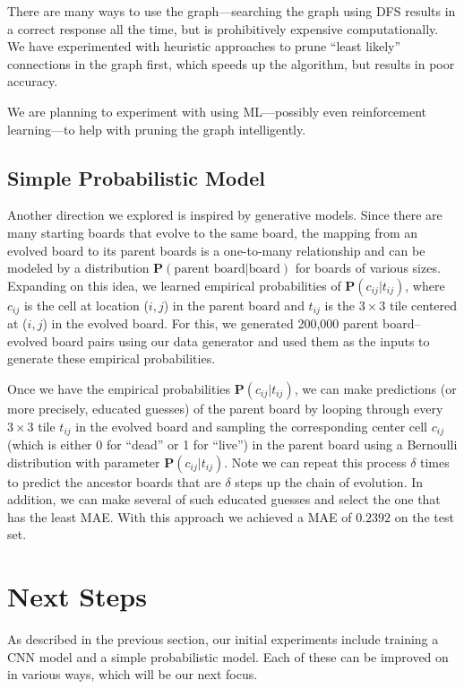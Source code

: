 \documentclass[conference]{IEEEtran}
\begin{document}
There are many ways to use the graph---searching the graph using DFS results in a correct response all the time, but is prohibitively expensive computationally. We have experimented with heuristic approaches to prune ``least likely'' connections in the graph first, which speeds up the algorithm, but results in poor accuracy.

We are planning to experiment with using ML---possibly even reinforcement learning---to help with pruning the graph intelligently.

\subsection{Simple Probabilistic Model}
Another direction we explored is inspired by generative models. Since there are many starting boards that evolve to the same board, the mapping from an evolved board to its parent boards is a one-to-many relationship and can be modeled by a distribution $\mathbf P(\textrm{parent board} | \textrm{board})$ for boards of various sizes. Expanding on this idea, we learned empirical probabilities of $\mathbf P(c_{ij} | t_{ij})$, where $c_{ij}$ is the cell at location ($i, j$) in the parent board and $t_{ij}$ is the $3 \times 3$ tile centered at ($i, j$) in the evolved board. For this, we generated 200,000 parent board--evolved board pairs using our data generator and used them as the inputs to generate these empirical probabilities. 

Once we have the empirical probabilities $\mathbf P(c_{ij} | t_{ij})$, we can make predictions (or more precisely, educated guesses) of the parent board by looping through every $3 \times 3$ tile $t_{ij}$ in the evolved board and sampling the corresponding center cell $c_{ij}$ (which is either 0 for ``dead'' or 1 for ``live'') in the parent board using a Bernoulli distribution with parameter $\mathbf P(c_{ij} | t_{ij})$. Note we can repeat this process $\delta$ times to predict the ancestor boards that are $\delta$ steps up the chain of evolution. In addition, we can make several of such educated guesses and select the one that has the least MAE. With this approach we achieved a MAE of $0.2392$ on the test set.

\section{Next Steps}
As described in the previous section, our initial experiments include training a CNN model and a simple probabilistic model. Each of these can be improved on in various ways, which will be our next focus. 
\end{document}
